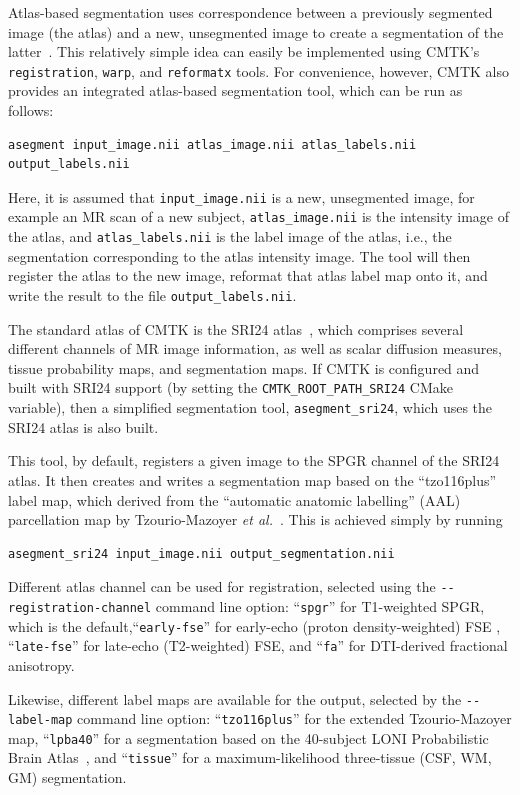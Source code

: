 \documentclass{InsightArticle}
\begin{document}
Atlas-based segmentation uses correspondence between a previously segmented
image (the atlas) and a new, unsegmented image to create a segmentation of the
latter~\cite{MillChriAmit:1993}. This relatively simple idea can easily be
implemented using CMTK's \verb|registration|, \verb|warp|, and
\verb|reformatx| tools. For convenience, however, CMTK also provides an
integrated atlas-based segmentation tool, which can be run as follows:
\begin{verbatim}
asegment input_image.nii atlas_image.nii atlas_labels.nii output_labels.nii
\end{verbatim}
Here, it is assumed that \verb|input_image.nii| is a new, unsegmented image,
for example an MR scan of a new subject, \verb|atlas_image.nii| is the
intensity image of the atlas, and \verb|atlas_labels.nii| is the label image
of the atlas, i.e., the segmentation corresponding to the atlas intensity
image. The tool will then register the atlas to the new image, reformat that
atlas label map onto it, and write the result to the file
\verb|output_labels.nii|.

The standard atlas of CMTK is the SRI24
atlas~\cite{RohlZahrSull:2008,RohlZahrSull:2010}, which comprises several
different channels of MR image information, as well as scalar diffusion
measures, tissue probability maps, and segmentation maps. If CMTK is
configured and built with SRI24 support (by setting the
\verb|CMTK_ROOT_PATH_SRI24| CMake variable), then a simplified segmentation
tool, \verb|asegment_sri24|, which uses the SRI24 atlas is also built.

This tool, by default, registers a given image to the SPGR channel of the
SRI24 atlas. It then creates and writes a segmentation map based on the
``tzo116plus'' label map, which derived from the ``automatic anatomic
labelling'' (AAL) parcellation map by Tzourio-Mazoyer {\em et
al.\/}~\cite{TzouLandPapa:2002}. This is achieved simply by running
\begin{verbatim}
asegment_sri24 input_image.nii output_segmentation.nii
\end{verbatim} 
Different atlas channel can be used for registration, selected
using the \verb|--registration-channel| command line option: ``\verb|spgr|''
for T1-weighted SPGR, which is the default,``\verb|early-fse|'' for early-echo
(proton density-weighted) FSE , ``\verb|late-fse|'' for late-echo
(T2-weighted) FSE, and ``\verb|fa|'' for DTI-derived fractional anisotropy.

Likewise, different label maps are available for the output, selected by the
\verb|--label-map| command line option: ``\verb|tzo116plus|'' for the extended
Tzourio-Mazoyer map, ``\verb|lpba40|'' for a segmentation based on the
40-subject LONI Probabilistic Brain Atlas~\cite{ShatMirzAdis:2008}, and
``\verb|tissue|'' for a maximum-likelihood three-tissue (CSF, WM, GM)
segmentation.
\end{document}
